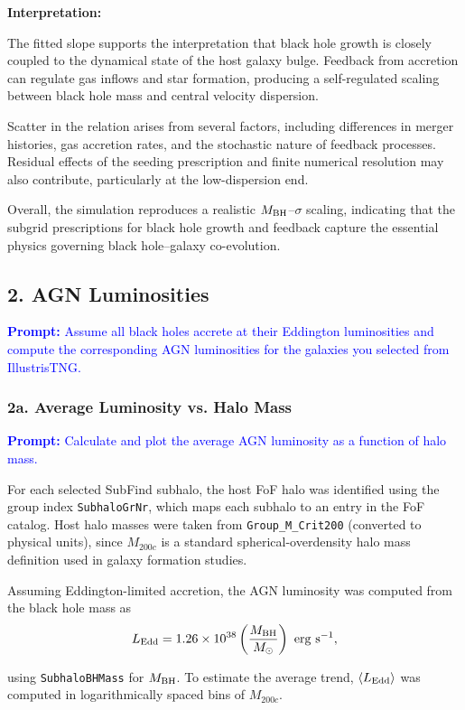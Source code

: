 \documentclass[twocolumn]{aastex631}
\begin{document}
\textbf{Interpretation:}

The fitted slope supports the 
interpretation that black hole growth is closely coupled to the dynamical state of the host galaxy 
bulge. Feedback from accretion can regulate gas inflows and star formation, producing a 
self-regulated scaling between black hole mass and central velocity dispersion.

Scatter in the relation arises from several factors, including differences in merger histories, 
gas accretion rates, and the stochastic nature of feedback processes. Residual effects of the 
seeding prescription and finite numerical resolution may also contribute, particularly at the 
low-dispersion end.

Overall, the simulation reproduces a realistic $M_{\rm BH}$–$\sigma$ scaling, indicating that the 
subgrid prescriptions for black hole growth and feedback capture the essential physics governing 
black hole–galaxy co-evolution.


\subsection{2. AGN Luminosities}
\textcolor{blue}{\textbf{Prompt:} Assume all black holes accrete at their Eddington luminosities and compute the corresponding AGN luminosities for the galaxies you selected from IllustrisTNG.}
\subsubsection{2a. Average Luminosity vs. Halo Mass}

\textcolor{blue}{\textbf{Prompt:} Calculate and plot the average AGN luminosity as a function of halo mass.}

For each selected SubFind subhalo, the host FoF halo was identified using the group index
\texttt{SubhaloGrNr}, which maps each subhalo to an entry in the FoF catalog. Host halo masses were
taken from \texttt{Group\_M\_Crit200} (converted to physical units), since \(M_{200c}\) is a standard
spherical-overdensity halo mass definition used in galaxy formation studies.

Assuming Eddington-limited accretion, the AGN luminosity was computed from the black hole mass as
\begin{equation}
L_{\rm Edd} = 1.26 \times 10^{38}\left(\frac{M_{\rm BH}}{M_\odot}\right)\ {\rm erg\ s^{-1}},
\end{equation}

using \texttt{SubhaloBHMass} for \(M_{\rm BH}\). To estimate the average trend,
\(\langle L_{\rm Edd}\rangle\) was computed in logarithmically spaced bins of \(M_{200c}\).
\end{document}
